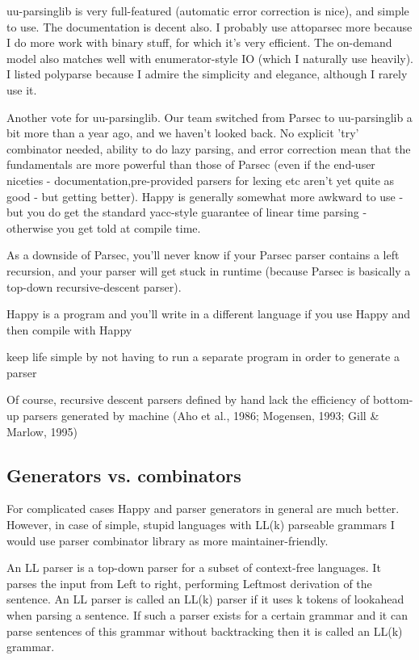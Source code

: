 uu-parsinglib is very full-featured (automatic error correction is nice), and simple to use. The documentation is decent also. I probably use attoparsec more because I do more work with binary stuff, for which it's very efficient. The on-demand model also matches well with enumerator-style IO (which I naturally use heavily). I listed polyparse because I admire the simplicity and elegance, although I rarely use it.

Another vote for uu-parsinglib. Our team switched from Parsec to uu-parsinglib a bit more than a year ago, and we haven't looked back. No explicit 'try' combinator needed, ability to do lazy parsing, and error correction mean that the fundamentals are more powerful than those of Parsec (even if the end-user niceties - documentation,pre-provided parsers for lexing etc aren't yet quite as good - but getting better). Happy is generally somewhat more awkward to use - but you do get the standard yacc-style guarantee of linear time parsing - otherwise you get told at compile time. 

As a downside of Parsec, you'll never know if your Parsec parser contains a left recursion, and your parser will get stuck in runtime (because Parsec is basically a top-down recursive-descent parser).

Happy is a program and you'll write in a different language if you use Happy and then compile with Happy

 keep life simple by not having to run a separate program in order to generate a parser 

Of course, recursive descent parsers defined by hand lack the efficiency of bottom-up parsers generated by machine (Aho et al., 1986; Mogensen, 1993; Gill & Marlow, 1995)

\subsection{Generators vs. combinators}
For complicated cases Happy and parser generators in general are much better. However, in case of simple, stupid languages with LL(k) parseable grammars I would use parser combinator library as more maintainer-friendly.

An LL parser is a top-down parser for a subset of context-free languages. It parses the input from Left to right, performing Leftmost derivation of the sentence.
An LL parser is called an LL(k) parser if it uses k tokens of lookahead when parsing a sentence. If such a parser exists for a certain grammar and it can parse sentences of this grammar without backtracking then it is called an LL(k) grammar.

